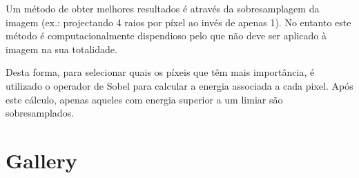 \documentclass[a4paper]{article}
\begin{document}
\indent Um método de obter melhores resultados é através da sobresamplagem da imagem (ex.: projectando
4 raios por píxel ao invés de apenas 1). No entanto este método é computacionalmente dispendioso pelo que não
deve ser aplicado à imagem na sua totalidade.

\indent Desta forma, para selecionar quais os píxeis que têm mais importância, é utilizado o operador de Sobel
para calcular a energia associada a cada pixel. Após este cálculo, apenas aqueles com energia superior a um limiar
são sobresamplados.

\cleardoublepage
\section{Gallery}
\indent \indent 
\end{document}
